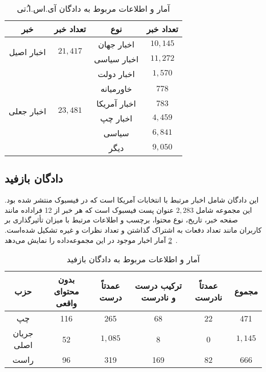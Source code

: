 \begin{table}[!h]
\caption{آمار و اطلاعات مربوط به دادگان آی.اس.ا.ُتی}
\label{ISOTDataset}
\begin{center}
\begin{tabular}{|c|c|c|c|}
\hline
خبر & 
تعداد خبر & 
 نوع & 
 تعداد خبر
 \\
\hline
\hline
\multirow{2}{*}{اخبار اصیل} 
&
\multirow{2}{*}{$21,417$}
 &
  اخبار جهان\footnotemark
& $10,145$ 
\\ 
& 
&
 اخبار سیاسی\footnotemark
& 
$11,272$ \\ 
\hline
\multirow{6}{*}{اخبار جعلی}
 &
\multirow{6}{*}{$23,481$}
&
  اخبار دولت
& $1,570$
\\
& &
 خاورمیانه
& $778$ \\ 
& & 
اخبار آمریکا
& $783$ \\
& & 
اخبار چپ
& $4,459$ \\ 
& & 
سیاسی
& $6,841$ \\ 
& & 
دیگر
& $9,050$ \\ 
\hline

\end{tabular}
\end{center}
\end{table}

\subsection{دادگان بازفید}

\noindent
این دادگان شامل اخبار مرتبط با انتخابات آمریکا است که در فیسبوک منتشر شده بود.
این مجموعه شامل $2,283$ عنوان پست فیسبوک است که هر خبر از 12 فراداده مانند
 صفحه خبر، تاریخ، نوع محتوا، برچسب و اطلاعات مرتبط با میزان تأثیرگذاری بر کاربران مانند تعداد دفعات به اشتراک گذاشتن و
 تعداد نظرات و غیره تشکیل شده‌است. \tablename~\ref{BuzzFeedDataset} آمار اخبار موجود در این مجموعه‌داده را نمایش می‌دهد.

\begin{table}[!h]
\caption{آمار و اطلاعات مربوط به دادگان بازفید}
\label{BuzzFeedDataset}
\begin{center}
\begin{tabular}{|c|c|c|c|c|c|}
\hline
حزب & بدون محتوای واقعی & عمدتاً درست & ترکیب درست و نادرست & عمدتاً نادرست & مجموع \\
\hline
\hline
چپ & 116 & 265 & 68 & 22 & 471 \\
\hline
جریان اصلی & 52 & $1,085$ & 8 & 0 & $1,145$ \\
\hline
راست & 96 & 319 & 169 & 82 & 666 \\
\hline
\end{tabular}
\end{center}
\end{table}


